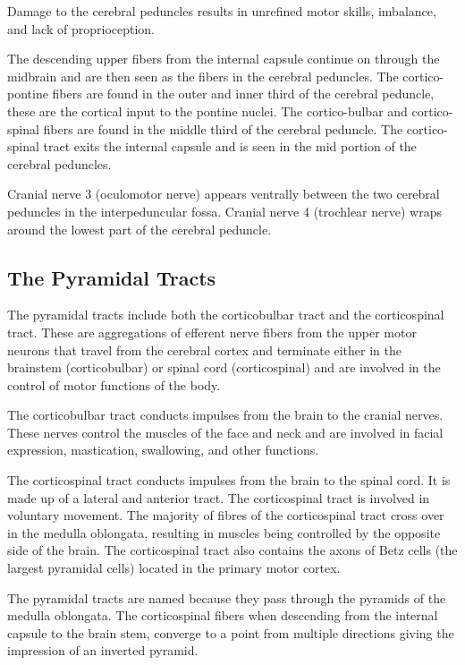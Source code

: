 Damage to the cerebral peduncles results in unrefined motor skills, imbalance, and lack of proprioception.

The descending upper fibers from the internal capsule continue on through the midbrain and are then seen as the fibers in the cerebral peduncles. The cortico-pontine fibers are found in the outer and inner third of the cerebral peduncle, these are the cortical input to the pontine nuclei. The cortico-bulbar and cortico-spinal fibers are found in the middle third of the cerebral peduncle. The cortico-spinal tract exits the internal capsule and is seen in the mid portion of the cerebral peduncles.

Cranial nerve 3 (oculomotor nerve) appears ventrally between the two cerebral peduncles in the interpeduncular fossa. Cranial nerve 4 (trochlear nerve) wraps around the lowest part of the cerebral peduncle.

\hypertarget{the-pyramidal-tracts}{%
\subsection{The Pyramidal Tracts}\label{the-pyramidal-tracts}}

The pyramidal tracts include both the corticobulbar tract and the corticospinal tract. These are aggregations of efferent nerve fibers from the upper motor neurons that travel from the cerebral cortex and terminate either in the brainstem (corticobulbar) or spinal cord (corticospinal) and are involved in the control of motor functions of the body.

The corticobulbar tract conducts impulses from the brain to the cranial nerves. These nerves control the muscles of the face and neck and are involved in facial expression, mastication, swallowing, and other functions.

The corticospinal tract conducts impulses from the brain to the spinal cord. It is made up of a lateral and anterior tract. The corticospinal tract is involved in voluntary movement. The majority of fibres of the corticospinal tract cross over in the medulla oblongata, resulting in muscles being controlled by the opposite side of the brain. The corticospinal tract also contains the axons of Betz cells (the largest pyramidal cells) located in the primary motor cortex.

The pyramidal tracts are named because they pass through the pyramids of the medulla oblongata. The corticospinal fibers when descending from the internal capsule to the brain stem, converge to a point from multiple directions giving the impression of an inverted pyramid.

